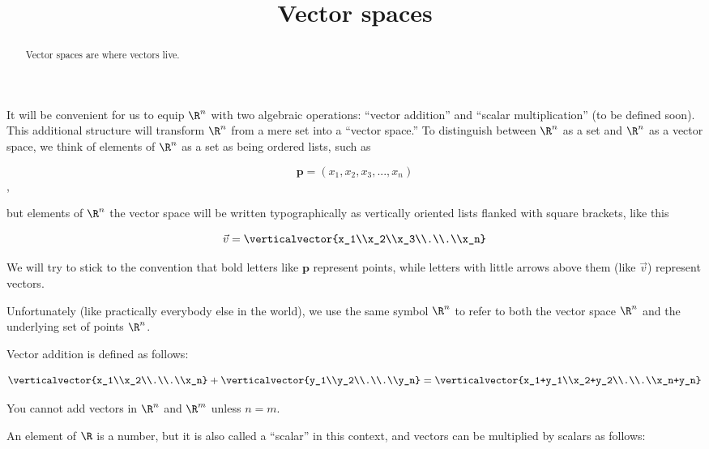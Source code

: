 \documentclass{ximera}
\title{Vector spaces}
\begin{document}
\begin{abstract}
  Vector spaces are where vectors live.
\end{abstract}

It will be convenient for us to equip $\R^n$ with two algebraic
operations: ``vector addition'' and ``scalar multiplication'' (to be
defined soon).  This additional structure will transform $\R^n$ from a
mere set into a ``vector space.''  To distinguish between $\R^n$ as a
set and $\R^n$ as a vector space, we think of elements of $\R^n$ as a
set as being ordered lists, such as
 
 \[\mathbf{p} = (x_1,x_2,x_3, ...,x_n)\],
 
but elements of $\R^n$ the vector space will be written typographically as vertically oriented lists flanked with square brackets, like this 
 
  \[ \vec{v}= \verticalvector{x_1\\x_2\\x_3\\.\\.\\x_n}\]
 
We will try to stick to the convention that bold letters like $\mathbf{p}$ represent points, while letters with little arrows above them (like $\vec{v}$) represent vectors. 

Unfortunately (like practically everybody else in the world), we use
the same symbol $\R^n$ to refer to both the vector space $\R^n$ and
the underlying set of points $\R^n$.
 
Vector addition is defined as follows:
 
\[\verticalvector{x_1\\x_2\\.\\.\\x_n} +\verticalvector{y_1\\y_2\\.\\.\\y_n}=\verticalvector{x_1+y_1\\x_2+y_2\\.\\.\\x_n+y_n}\]

\begin{warning}
  You cannot add vectors in $\R^n$ and $\R^m$ unless $n = m$.
\end{warning}

An element of $\R$ is a number, but it is also called a ``scalar'' in this context, and vectors can be multiplied by scalars as follows:
	
\end{document}
